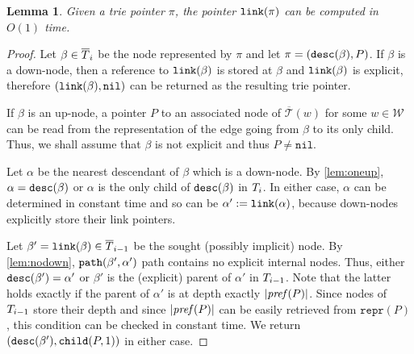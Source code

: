 \documentclass[a4paper]{article}
\newtheorem{lemma}[theorem]{Lemma}
\theoremstyle{remark}
\newcommand{\ustree}{\mathcal{\overline{T}}}
\newcommand{\coll}{\mathcal{W}}
\newcommand{\itchild}{\mathtt{child}}
\newcommand{\itrepr}{\mathtt{repr}}
\newcommand{\itnil}{\mathtt{nil}}
\begin{document}
\begin{lemma}\label{lem:link}
Given a trie pointer $\pi$, the pointer $\mathtt{link}(\pi)$
can be computed in $O(1)$ time.
\end{lemma}
\begin{proof}
Let $\beta\in \overline{T}_i$ be the node represented by $\pi$ and let $\pi=(\mathtt{desc}(\beta),P)$.
If $\beta$ is a down-node, then a reference to $\mathtt{link}(\beta)$ is stored at $\beta$ and $\mathtt{link}(\beta)$ is explicit, therefore $(\tlink(\beta), \itnil)$ can be returned as the resulting trie pointer.

If $\beta$ is an up-node, a pointer $P$ to an associated node of $\ustree(w)$ for some $w\in \coll$
can be read from the representation of the edge going from $\beta$ to its only child.
Thus, we shall assume that $\beta$ is not explicit and thus $P\ne \itnil$.

Let $\alpha$ be the nearest descendant of $\beta$ which is a down-node.
By \cref{lem:oneup}, $\alpha=\mathtt{desc}(\beta)$ or $\alpha$ is the only child of $\mathtt{desc}(\beta)$ in $T_i$.
In either case, $\alpha$ can be determined in constant time and so can be $\alpha':=\mathtt{link}(\alpha)$,
because down-nodes explicitly store their link pointers.

Let $\beta'=\mathtt{link}(\beta)\in \overline{T}_{i-1}$ be the sought (possibly implicit) node.
By \cref{lem:nodown}, $\mathtt{path}(\beta',\alpha')$ path contains no explicit internal nodes.
Thus, either $\mathtt{desc}(\beta')=\alpha'$ or $\beta'$ is the (explicit) parent of $\alpha'$ in $T_{i-1}$.
Note that the latter holds exactly if the parent of $\alpha'$ is at depth exactly $|\mathit{pref}(P)|$.
Since nodes of $T_{i-1}$ store their depth and since $|\mathit{pref}(P)|$ can be easily retrieved from $\itrepr(P)$,
this condition can be checked in constant time. We return $(\tdesc(\beta'),\itchild(P,1))$ in either case.
\end{proof}
\end{document}
